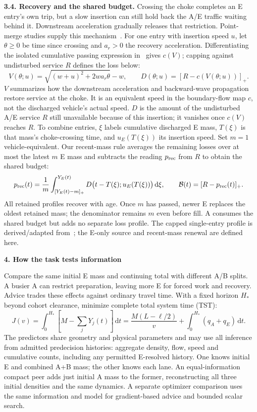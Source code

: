 \documentclass[10pt,a4paper]{article}
\newcommand{\pos}[1]{[#1]_+}
\newcommand{\bud}{\mathcal B}
\newcommand{\dd}{\,\mathrm d}
\newcommand{\head}[1]{\par\vspace{4pt}\noindent\textbf{#1}\par\nobreak\vspace{1pt}}
\begin{document}
\textbf{3.4. Recovery and the shared budget.}
Crossing the choke completes an E entry's own trip, but a slow insertion
can still hold back the A/E traffic waiting behind it. Downstream acceleration
gradually releases that restriction. Point-merge studies supply this
mechanism~\cite{leclercq2011,leclercq}. For one entry with insertion speed
$u$, let $\theta\geq0$ be time since crossing and $a_r>0$ the recovery
acceleration. Differentiating the isolated cumulative passing expression
in~\cite{leclercq} gives $c(V)$; capping against undisturbed service $R$
defines the loss below:
\begin{equation}
 V(\theta;u)=\sqrt{(w+u)^2+2wa_r\theta}-w,\qquad
 D(\theta;u)=\pos{R-c(V(\theta;u))}.
 \label{eq:profile}
\end{equation}
$V$ summarizes how the downstream acceleration and backward-wave propagation
restore service at the choke. It is an equivalent speed in the boundary-flow
map $c$, not the discharged vehicle's actual speed. $D$ is the amount of
the undisturbed A/E service $R$ still unavailable because of this insertion;
it vanishes once $c(V)$ reaches $R$.
To combine entries, $\xi$ labels cumulative discharged E mass,
$T(\xi)$ is that mass's choke-crossing time, and $u_E(T(\xi))$ its insertion
speed. Set $m=1$ vehicle-equivalent. Our recent-mass rule averages the
remaining losses over at most the latest $m$ E mass and subtracts the
reading $p_{\rm rec}$ from $R$ to obtain the shared budget:
\begin{equation}
 p_{\rm rec}(t)=\frac1m\int_{\pos{Y_E(t)-m}}^{Y_E(t)}
 D\bigl(t-T(\xi);u_E(T(\xi))\bigr)\dd\xi,\qquad
 \bud(t)=\pos{R-p_{\rm rec}(t)}.
 \label{eq:recovery}
\end{equation}
All retained profiles recover with age. Once $m$ has passed, newer
E replaces the oldest retained mass; the denominator remains $m$ even before
fill. A consumes the shared budget but adds no separate loss profile.
The capped single-entry profile is derived/adapted from~\cite{leclercq};
the E-only source and recent-mass renewal are defined here.

\head{4. How the task tests information}
Compare the same initial E mass and continuing total with different A/B
splits. A busier A can restrict preparation, leaving more E for forced work
and recovery. Advice trades these effects against ordinary travel time.
With a fixed horizon $H_*$ beyond cohort clearance, minimize complete
total system time (TST):
\begin{equation}
 J(v)=\int_0^{H_*}\!\left[M-\sum_jY_j(t)\right]\dd t
 =\frac{M(L-\ell/2)}v+\int_0^{H_*}(q_A+q_E)\dd t.
 \label{eq:objective}
\end{equation}
The predictors share geometry and physical parameters and may use all
inference from admitted predecision histories: aggregate density, flow,
speed and cumulative counts, including any permitted E-resolved history.
One knows initial E and combined A+B mass; the other knows each lane.
An equal-information compact peer adds just initial A mass to the former,
reconstructing all three initial densities and the same dynamics.
A separate optimizer comparison uses the same information and model
for gradient-based advice and bounded scalar search.
\end{document}
